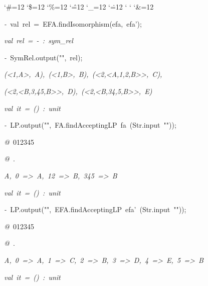 \begin{list}{}
{\setlength{\leftmargin}{\leftmargini}
\setlength{\rightmargin}{0cm}
\setlength{\itemindent}{0cm}
\setlength{\listparindent}{0cm}
\setlength{\itemsep}{0cm}
\setlength{\parsep}{0cm}
\setlength{\labelsep}{0cm}
\setlength{\labelwidth}{0cm}
\catcode`\#=12
\catcode`\$=12
\catcode`\%=12
\catcode`\^=12
\catcode`\_=12
\catcode`\.=12
\catcode`
\catcode`
\catcode`\&=12
\ttfamily}
\small
\item[]\textsl{-\ }val\ rel\ =\ EFA.findIsomorphism(efa,\ efa');
\item[]\textsl{val\ rel\ =\ -\ :\ sym_rel}
\item[]\textsl{-\ }SymRel.output("",\ rel);
\item[]\textsl{(<1,A>,\ A),\ (<1,B>,\ B),\ (<2,<A,1,2,B>>,\ C),}
\item[]\textsl{(<2,<B,3,45,B>>,\ D),\ (<2,<B,34,5,B>>,\ E)}
\item[]\textsl{val\ it\ =\ ()\ :\ unit}
\item[]\textsl{-\ }LP.output("",\ FA.findAcceptingLP\ fa\ (Str.input\ ""));
\item[]\textsl{@\ }012345
\item[]\textsl{@\ }.
\item[]\textsl{A,\ 0\ =>\ A,\ 12\ =>\ B,\ 345\ =>\ B}
\item[]\textsl{val\ it\ =\ ()\ :\ unit}
\item[]\textsl{-\ }LP.output("",\ EFA.findAcceptingLP\ efa'\ (Str.input\ ""));
\item[]\textsl{@\ }012345
\item[]\textsl{@\ }.
\item[]\textsl{A,\ 0\ =>\ A,\ 1\ =>\ C,\ 2\ =>\ B,\ 3\ =>\ D,\ 4\ =>\ E,\ 5\ =>\ B}
\item[]\textsl{val\ it\ =\ ()\ :\ unit}
\end{list}
